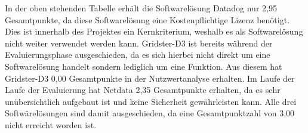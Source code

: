 {\begin{table}[H]
\caption{Nutzwertanalyse Datadog, Gridster-D3 und Netdata}
\label{nwa_dgn}
\end{table}

In der oben stehenden Tabelle erhält die Softwarelösung Datadog nur 2,95
Gesamtpunkte, da diese Softwarelösung eine Kostenpflichtige Lizenz benötigt.
Dies ist innerhalb des Projektes ein Kernkriterium, weshalb es als
Softwarelösung nicht weiter verwendet werden kann. Gridster\hyp{}D3 ist bereits
während der Evaluierungsphase ausgeschieden, da es sich hierbei nicht direkt um
eine Softwarelösung handelt sondern lediglich um eine Funktion. Aus diesem
hat Gridster\hyp{}D3 0,00 Gesamtpunkte in der Nutzwertanalyse erhalten. Im Laufe der
Laufe der Evaluierung hat Netdata 2,35 Gesamtpunkte erhalten, da es sehr
unübersichtlich aufgebaut ist und keine Sicherheit gewährleisten kann. Alle
drei Softwärelösungen sind damit ausgeschieden, da eine Gesamtpunktzahl von
3,00 nicht erreicht worden ist.

}
